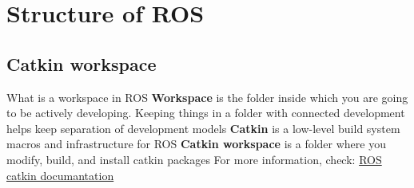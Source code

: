\documentclass{beamer}
\begin{document}

\section{Structure of ROS}
\subsection{Catkin workspace}
\begin{frame}{What is a workspace in ROS}
\textbf{Workspace} is the folder inside which you are going to be actively developing. Keeping things in a folder with connected development helps keep separation of development models
\vfill
\textbf{Catkin} is a low-level build system macros and infrastructure for ROS
\vfill
\textbf{Catkin workspace} is a folder where you modify, build, and install catkin packages
\vfill
For more information, check: \href{http://wiki.ros.org/catkin}{ROS catkin documantation}
\end{frame}
\end{document}

